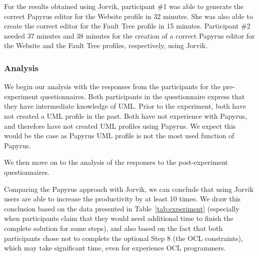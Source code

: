 For the results obtained using Jorvik, participant \#1 was able to generate the correct Papyrus editor for the Website profile in 32 minutes. She was also able to create the correct editor for the Fault Tree profile in 15 minutes.
Participant \#2 needed 37 minutes and 38 minutes for the creation of a correct Papyrus editor for the Website and the Fault Tree profiles, respectively, using Jorvik.


\subsubsection{Analysis} 
We begin our analysis with the responses from the participants for the pre-experiment questionnaires.
Both participants in the questionnaire express that they have intermediate knowledge of UML. 
Prior to the experiment, both have not created a UML profile in the past.
Both have not experience with Papyrus, and therefore have not created UML profiles using Papyrus.
We expect this would be the case as Papyrus UML profile is not the most used function of Papyrus.

We then move on to the analysis of the responses to the post-experiment questionnaires. 


Comparing the Papyrus approach with Jorvik, we can conclude that using Jorvik users are able to increase the productivity by at least 10 times. 
We draw this conclusion based on the data presented in Table~\ref{tab:experiment} (especially when participants claim that they would need additional time to finish the complete solution for some steps), and also based on the fact that both participants chose not to complete the optional Step 8 (the OCL constraints), which may take significant time, even for experience OCL programmers.

